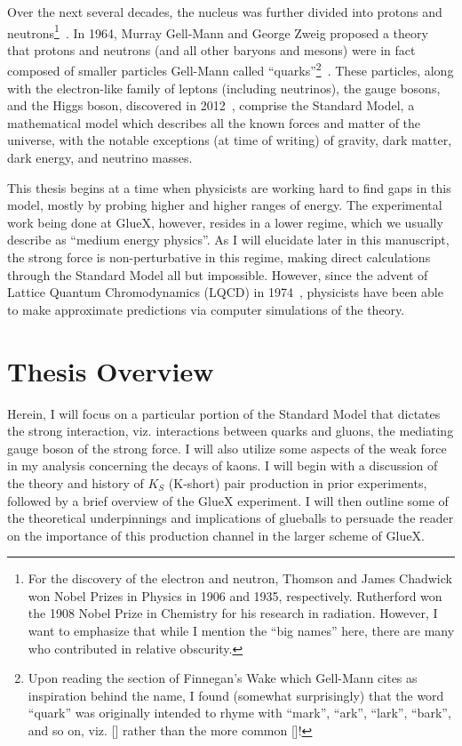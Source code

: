 Over the next several decades, the nucleus was further divided into protons and neutrons\footnote{For the discovery of the electron and neutron, Thomson and James Chadwick won Nobel Prizes in Physics in 1906 and 1935, respectively. Rutherford won the 1908 Nobel Prize in Chemistry for his research in radiation. However, I want to emphasize that while I mention the ``big names'' here, there are many who contributed in relative obscurity.}~\cite{masson_xxiv_1921,chadwick_possible_1932}. In 1964, Murray Gell-Mann and George Zweig proposed a theory that protons and neutrons (and all other baryons and mesons) were in fact composed of smaller particles Gell-Mann called ``quarks''\footnote{Upon reading the section of Finnegan's Wake which Gell-Mann cites as inspiration behind the name, I found (somewhat surprisingly) that the word ``quark'' was originally intended to rhyme with ``mark'', ``ark'', ``lark'', ``bark'', and so on, viz. [] rather than the more common []!}~\cite{gell-mann_schematic_1964}. These particles, along with the electron-like family of leptons (including neutrinos), the gauge bosons, and the Higgs boson, discovered in 2012~\cite{aad_observation_2012}, comprise the Standard Model, a mathematical model which describes all the known forces and matter of the universe, with the notable exceptions (at time of writing) of gravity, dark matter, dark energy, and neutrino masses.

This thesis begins at a time when physicists are working hard to find gaps in this model, mostly by probing higher and higher ranges of energy. The experimental work being done at GlueX, however, resides in a lower regime, which we usually describe as ``medium energy physics''. As I will elucidate later in this manuscript, the strong force is non-perturbative in this regime, making direct calculations through the Standard Model all but impossible. However, since the advent of Lattice Quantum Chromodynamics (LQCD) in 1974~\cite{wilson_confinement_1974}, physicists have been able to make approximate predictions via computer simulations of the theory.

\section{Thesis Overview}\label{sec:thesis_overview}

Herein, I will focus on a particular portion of the Standard Model that dictates the strong interaction, viz. interactions between quarks and gluons, the mediating gauge boson of the strong force. I will also utilize some aspects of the weak force in my analysis concerning the decays of kaons. I will begin with a discussion of the theory and history of $K_S$ (K-short) pair production in prior experiments, followed by a brief overview of the GlueX experiment. I will then outline some of the theoretical underpinnings and implications of glueballs to persuade the reader on the importance of this production channel in the larger scheme of GlueX.

